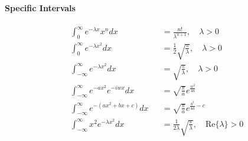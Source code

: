 \paragraph{Specific Intervals}
\begin{footnotesize}
    \noindent\begin{align*}
         & \int_0^{\infty} e^{-\lambda x}x^n dx               &  & =\frac{n!}{\lambda ^{n+1}},\quad \lambda >0              \\
         & \int_0^{\infty} e^{-\lambda x^2} dx                &  & =\frac{1}{2}\sqrt{\frac{\pi}{\lambda }},\quad \lambda >0 \\
         & \int_{-\infty}^{\infty} e^{-\lambda x^2} dx        &  & =\sqrt{\frac{\pi}{\lambda }},\quad \lambda >0            \\
         & \int_{-\infty}^{\infty}e^{-ax^2}e^{-iwx} dx &  & = \sqrt{\frac{\pi}{a}}e^{\frac{w^2}{4a}}   \\
         & \int_{-\infty}^{\infty}e^{-(ax^2+bx+c)}dx   &  & = \sqrt{\frac{\pi}{a}}e^{\frac{b^2}{4a}-c} \\
         & \int_{-\infty}^{\infty}x^2e^{-\lambda x^2}dx   &  & = \frac{1}{2\lambda }\sqrt{\frac{\pi}{\lambda }},\quad \mathrm{Re}\{\lambda \} >0
    \end{align*}
\end{footnotesize}
